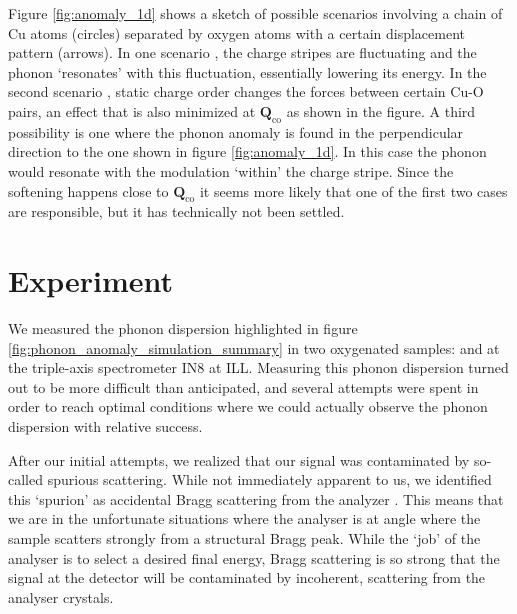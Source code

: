 Figure \ref{fig:anomaly_1d} shows a sketch of possible scenarios involving a chain of Cu atoms (circles) separated by oxygen atoms with a certain displacement pattern (arrows). In one scenario \cite{Kaneshita2002}, the charge stripes are fluctuating and the phonon `resonates' with this fluctuation, essentially lowering its energy. In the second scenario \cite{Reznik2006}, static charge order changes the forces between certain Cu-O pairs, an effect that is also minimized at $\bm{Q}_\text{co}$ as shown in the figure. A third possibility is one where the phonon anomaly is found in the perpendicular direction to the one shown in figure \ref{fig:anomaly_1d}. In this case the phonon would resonate with the modulation `within' the charge stripe. Since the softening happens close to $\bm{Q}_\text{co}$ it seems more likely that one of the first two cases are responsible, but it has technically not been settled.

\section{Experiment}
We measured the phonon dispersion highlighted in figure \ref{fig:phonon_anomaly_simulation_summary} in two oxygenated samples: \LCOO{} and \LSCOOsix{} at the triple-axis spectrometer IN8 at ILL. Measuring this phonon dispersion turned out to be more difficult than anticipated, and several attempts were spent in order to reach optimal conditions where we could actually observe the phonon dispersion with relative success.

After our initial attempts, we realized that our signal was contaminated by so-called spurious scattering. While not immediately apparent to us, we identified this `spurion' as accidental Bragg scattering from the analyzer \cite{Shirane2002}. This means that we are in the unfortunate situations where the analyser is at angle where the sample scatters strongly from a structural Bragg peak. While the `job' of the analyser is to select a desired final energy, Bragg scattering is so strong that the signal at the detector will be contaminated by incoherent, scattering from the analyser crystals.

